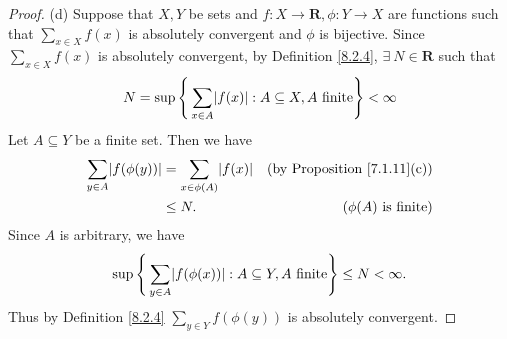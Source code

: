 \begin{proof}{(d)}
    Suppose that \(X, Y\) be sets and \(f : X \to \mathbf{R}, \phi : Y \to X\) are functions such that \(\sum_{x \in X} f(x)\) is absolutely convergent and \(\phi\) is bijective.
    Since \(\sum_{x \in X} f(x)\) is absolutely convergent, by Definition \ref{8.2.4}, \(\exists\ N \in \mathbf{R}\) such that
    \[
        N = \sup\Bigg\{\sum_{x \in A} \abs*{f(x)} : A \subseteq X, A \text{ finite}\Bigg\} < \infty
    \]
    Let \(A \subseteq Y\) be a finite set.
    Then we have
    \begin{align*}
        \sum_{y \in A} \abs*{f(\phi(y))} & = \sum_{x \in \phi(A)} \abs*{f(x)} & \text{(by Proposition \ref{7.1.11}(c))} \\
                                         & \leq N.                            & \text{(\(\phi(A)\) is finite)}
    \end{align*}
    Since \(A\) is arbitrary, we have
    \[
        \sup\Bigg\{\sum_{y \in A} \abs*{f(\phi(x))} : A \subseteq Y, A \text{ finite}\Bigg\} \leq N < \infty.
    \]
    Thus by Definition \ref{8.2.4} \(\sum_{y \in Y} f(\phi(y))\) is absolutely convergent.


\end{proof}
